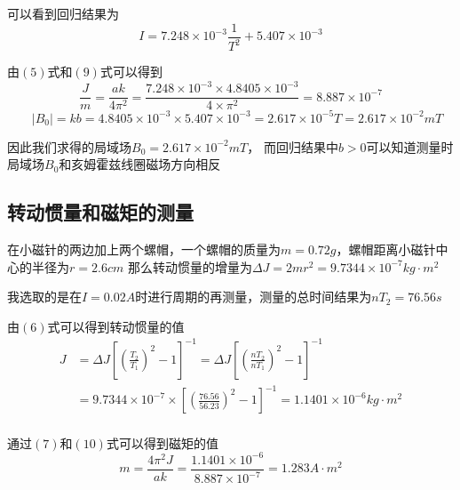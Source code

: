 \documentclass{article}
\begin{document}
可以看到回归结果为$$I=7.248\times 10^{-3}\frac{1}{T^2}+5.407\times 10^{-3}$$

由$(5)$式和$(9)$式可以得到
\begin{equation}
    \frac{J}{m}=\frac{ak}{4\pi ^2}=\frac{7.248\times 10^{-3}\times 4.8405\times 10^{-3}}{4\times \pi^2}=8.887\times 10^{-7}
\end{equation}
\begin{equation}
    \quad |B_0|=kb=4.8405\times 10^{-3}\times 5.407\times 10^{-3}=2.617\times 10^{-5}T=2.617 \times 10^{-2}mT
\end{equation}

因此我们求得的局域场$B_0=2.617\times 10^{-2}mT$，
而回归结果中$b>0$可以知道测量时局域场$B_0$和亥姆霍兹线圈磁场方向相反

\subsection{转动惯量和磁矩的测量}
在小磁针的两边加上两个螺帽，一个螺帽的质量为$m=0.72g$，螺帽距离小磁针中心的半径为$r=2.6cm$
那么转动惯量的增量为$\Delta J=2mr^2=9.7344\times 10^{-7}kg\cdot m^2$

我选取的是在$I=0.02A$时进行周期的再测量，测量的总时间结果为$nT_2=76.56s$

由$(6)$式可以得到转动惯量的值
\begin{align*}
    J&=\Delta J[(\frac{T_2}{T_1})^2-1]^{-1}=\Delta J[(\frac{nT_2}{nT_1})^2-1]^{-1} \\
    &=9.7344\times 10^{-7}\times [(\frac{76.56}{56.23})^2-1]^{-1}=1.1401\times 10^{-6}kg\cdot m^2\\
\end{align*}

通过$(7)$和$(10)$式可以得到磁矩的值
$$m=\frac{4\pi ^2J}{ak}=\frac{1.1401\times 10^{-6}}{8.887\times 10^{-7}}=1.283A\cdot m^2$$
\end{document}
